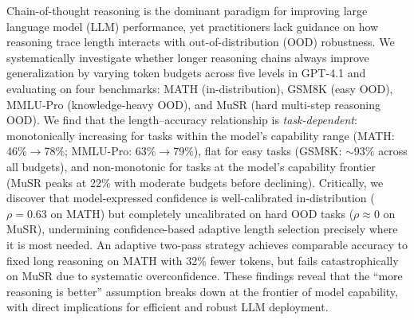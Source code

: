 Chain-of-thought reasoning is the dominant paradigm for improving large language model (LLM) performance, yet practitioners lack guidance on how reasoning trace length interacts with out-of-distribution (OOD) robustness.
We systematically investigate whether longer reasoning chains always improve generalization by varying token budgets across five levels in GPT-4.1 and evaluating on four benchmarks: MATH (in-distribution), GSM8K (easy OOD), MMLU-Pro (knowledge-heavy OOD), and MuSR (hard multi-step reasoning OOD).
We find that the length--accuracy relationship is \emph{task-dependent}: monotonically increasing for tasks within the model's capability range (MATH: 46\%$\rightarrow$78\%; MMLU-Pro: 63\%$\rightarrow$79\%), flat for easy tasks (GSM8K: ${\sim}$93\% across all budgets), and non-monotonic for tasks at the model's capability frontier (MuSR peaks at 22\% with moderate budgets before declining).
Critically, we discover that model-expressed confidence is well-calibrated in-distribution ($\rho{=}0.63$ on MATH) but completely uncalibrated on hard OOD tasks ($\rho{\approx}0$ on MuSR), undermining confidence-based adaptive length selection precisely where it is most needed.
An adaptive two-pass strategy achieves comparable accuracy to fixed long reasoning on MATH with 32\% fewer tokens, but fails catastrophically on MuSR due to systematic overconfidence.
These findings reveal that the ``more reasoning is better'' assumption breaks down at the frontier of model capability, with direct implications for efficient and robust LLM deployment.
